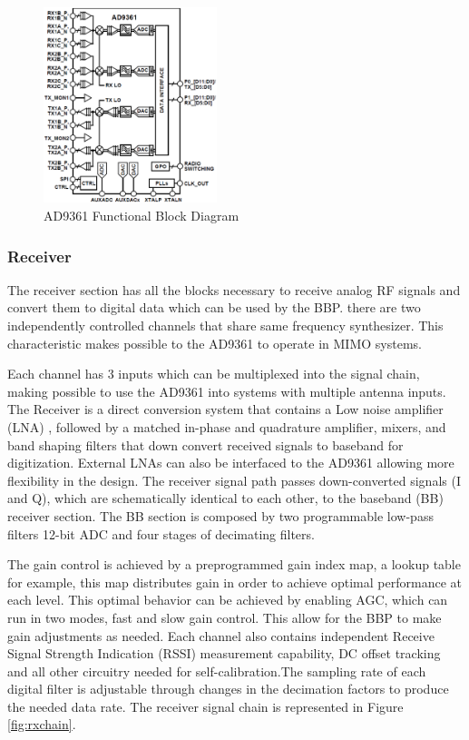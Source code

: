 %
\begin{figure}[htbp]
    \centering
    \includegraphics[width=0.45\textwidth]{./figures/ad9361_functional_diagram}
    \caption{ AD9361 Functional Block Diagram
    \label{fig:ad9361func}}
\end{figure}

\subsubsection{Receiver}

The receiver section has all the blocks necessary to receive analog RF signals
and convert them to digital data which can be used by the BBP. there are two
independently controlled channels that share same frequency synthesizer. This
characteristic makes possible to the AD9361 to operate in MIMO systems.

Each channel has 3 inputs which can be multiplexed into the signal chain,
making possible to use the AD9361 into systems with multiple antenna inputs.
The Receiver is a direct conversion system that contains a Low noise amplifier
(LNA) , followed by a matched in-phase and quadrature amplifier, mixers, and
band shaping filters that down convert received signals to baseband for
digitization. External LNAs can also be interfaced to the AD9361 allowing more
flexibility in the design. The receiver signal path passes down-converted
signals (I and Q), which are schematically identical to each other,  to the
baseband (BB) receiver section. The BB section is composed by two programmable
low-pass filters 12-bit ADC and four stages of decimating filters.

The gain control is achieved by a preprogrammed gain index map, a lookup table
for example, this map distributes gain in order to achieve optimal performance
at each level. This optimal behavior can be achieved by enabling AGC, which can
run in two modes, fast and slow gain control. This allow for the BBP to make
gain adjustments as needed. Each channel also contains independent Receive
Signal Strength Indication (RSSI) measurement capability, DC offset tracking and
all other circuitry needed for self-calibration.The sampling rate of each
digital filter is adjustable through changes in the decimation factors to
produce the needed data rate. The receiver signal chain is represented in Figure
\ref{fig:rxchain}.

